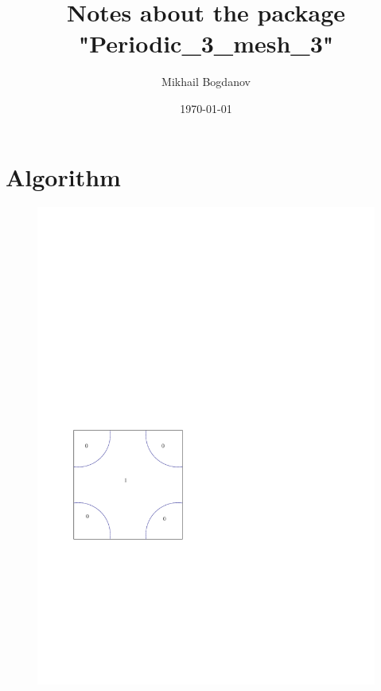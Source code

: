 \documentclass[a4paper,11pt]{article}
\begin{document}
\title{Notes about the package "Periodic\_3\_mesh\_3"}
\author{Mikhail Bogdanov}
\date{\today}
\maketitle

\section{Algorithm}

\begin{figure}[h!]
\centerline{\includegraphics[scale=1]{fig/implicit_function.pdf}}
\caption{\label{}}
\end{figure}
\end{document}
